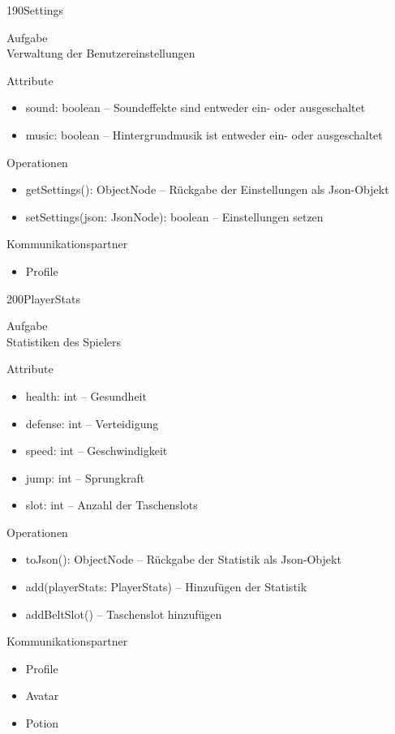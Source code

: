 \newpage
\begin{class}{190}{Settings}
\item[Aufgabe]~\\
Verwaltung der Benutzereinstellungen
\item[Attribute]~\\
\begin{itemize}
\item sound: boolean -- Soundeffekte sind entweder ein- oder ausgeschaltet
\item music: boolean -- Hintergrundmusik ist entweder ein- oder ausgeschaltet
\end{itemize}
\item[Operationen]~\\
\begin{itemize}
\item getSettings(): ObjectNode -- Rückgabe der Einstellungen als Json-Objekt
\item setSettings(json: JsonNode): boolean -- Einstellungen setzen
\end{itemize}
\item[Kommunikationspartner]~\\
\begin{itemize}
\item Profile
\end{itemize}
\end{class}

\newpage
\begin{class}{200}{PlayerStats}
\item[Aufgabe]~\\
Statistiken des Spielers
\item[Attribute]~\\
\begin{itemize}
\item health: int -- Gesundheit
\item defense: int -- Verteidigung
\item  speed: int -- Geschwindigkeit
\item jump: int -- Sprungkraft
\item  slot: int -- Anzahl der Taschenslots
\end{itemize}
\item[Operationen]~\\
\begin{itemize}
\item toJson(): ObjectNode -- Rückgabe der Statistik als Json-Objekt
\item add(playerStats: PlayerStats) -- Hinzufügen der Statistik
\item addBeltSlot() -- Taschenslot hinzufügen
\end{itemize}
\item[Kommunikationspartner]~\\
\begin{itemize}
\item Profile
\item Avatar
\item Potion
\end{itemize}
\end{class}

